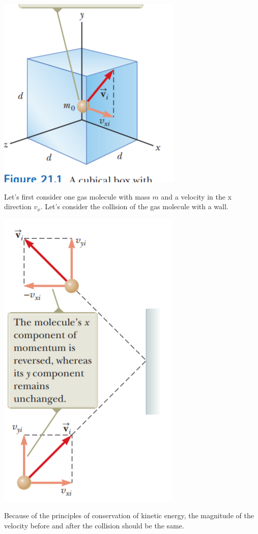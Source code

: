 \documentclass{report}
\begin{document}
\begin{center}
    \includegraphics[scale=0.5]{kinetic_model.PNG}
\end{center}

Let's first consider one gas molecule with mass $m$ and a velocity in the x direction $v_x$. Let's consider the collision of the gas molecule with a wall.

\begin{center}
    \includegraphics[scale=0.5]{kin_mod_bounce.PNG}
\end{center}
Because of the principles of conservation of kinetic energy, the magnitude of the velocity before and after the collision should be the same. 
\end{document}
